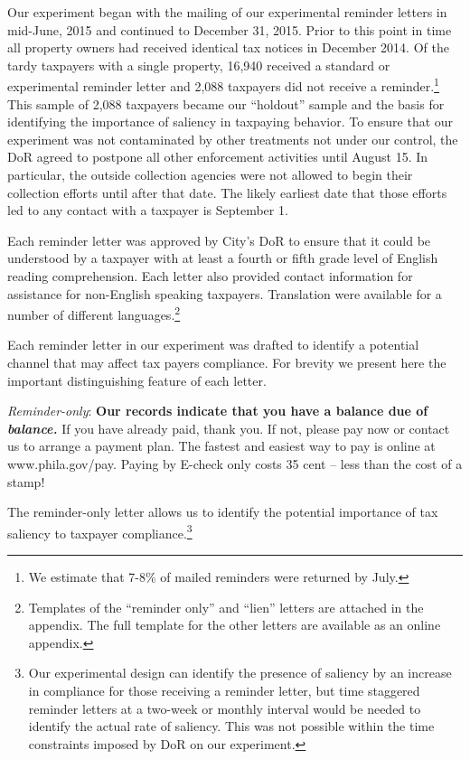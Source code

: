 \documentclass[12pt]{article}
\begin{document}
Our experiment began with the mailing of our experimental reminder
letters in mid-June, 2015 and continued to December 31, 2015. Prior to
this point in time all property owners had received identical tax
notices in December 2014.  Of the tardy taxpayers with a single
property, 16,940 received a standard or experimental reminder letter
and 2,088 taxpayers did not receive a reminder.\footnote{We estimate
  that 7-8\% of mailed reminders were returned by July.}  This sample
of 2,088 taxpayers became our ``holdout'' sample and the basis for
identifying the importance of saliency in taxpaying behavior. To
ensure that our experiment was not contaminated by other treatments
not under our control, the DoR agreed to postpone all other
enforcement activities until August 15.  In particular, the outside
collection agencies were not allowed to begin their collection efforts
until after that date.  The likely earliest date that those efforts
led to any contact with a taxpayer is September 1.

Each reminder letter was approved by City's DoR to ensure that it
could be understood by a taxpayer with at least a fourth or fifth
grade level of English reading comprehension.  Each letter also
provided contact information for assistance for non-English speaking
taxpayers.  Translation were available for a number of different
languages.\footnote{Templates of the ``reminder only'' and ``lien''
  letters are attached in the appendix.  The full template for the
  other letters are available as an online appendix.}

Each reminder letter in our experiment was drafted to identify a
potential channel that may affect tax payers compliance. For brevity
we present here the important distinguishing feature of each letter.

\bigskip

\noindent \textit{Reminder-only}: \textbf{Our records indicate
that you have a balance due of \textit{balance. }} If you have
already paid, thank you.  If not, please pay now or contact us
to arrange a payment plan.  The fastest and easiest way to pay is
online at  www.phila.gov/pay. Paying by E-check only costs 35 cent
-- less than the cost of a stamp!

\bigskip

The reminder-only letter allows us to identify the potential
importance of tax saliency to taxpayer compliance.\footnote{Our
  experimental design can identify the presence of saliency by an
  increase in compliance for those receiving a reminder letter, but
  time staggered reminder letters at a two-week or monthly interval
  would be needed to identify the actual rate of saliency.  This was
  not possible within the time constraints imposed by DoR on our
  experiment.  }
\end{document}
